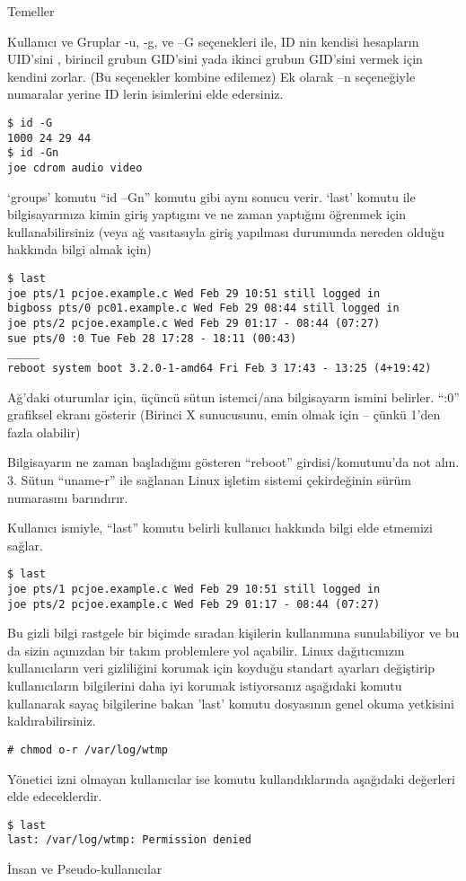 \begin{section}{Temeller}
\begin{subsection}{Kullanıcı ve Gruplar}
-u, -g, ve –G seçenekleri ile, ID nin kendisi hesapların UID’sini , birincil grubun GID’sini yada ikinci grubun GID’sini vermek için kendini zorlar. (Bu seçenekler kombine edilemez) Ek olarak –n seçeneğiyle numaralar yerine ID lerin isimlerini elde edersiniz.
\begin{verbatim}
$ id -G
1000 24 29 44
$ id -Gn
joe cdrom audio video
\end{verbatim}

‘groups’ komutu “id –Gn” komutu gibi aynı sonucu verir. ‘last’ komutu ile bilgisayarınıza kimin giriş yaptıgını ve ne zaman yaptığını öğrenmek için kullanabilirsiniz (veya ağ vasıtasıyla giriş yapılması durumunda nereden olduğu hakkında bilgi almak için)
\begin{verbatim}
$ last
joe pts/1 pcjoe.example.c Wed Feb 29 10:51 still logged in
bigboss pts/0 pc01.example.c Wed Feb 29 08:44 still logged in
joe pts/2 pcjoe.example.c Wed Feb 29 01:17 - 08:44 (07:27)
sue pts/0 :0 Tue Feb 28 17:28 - 18:11 (00:43)
_____
reboot system boot 3.2.0-1-amd64 Fri Feb 3 17:43 - 13:25 (4+19:42)
\end{verbatim}

Ağ’daki oturumlar için, üçüncü sütun istemci/ana bilgisayarın ismini belirler. “:0” grafiksel ekranı gösterir (Birinci X sunucusunu, emin olmak için – çünkü 1’den fazla olabilir)

Bilgisayarın ne zaman başladığını gösteren “reboot” girdisi/komutunu’da not alın. 3. Sütun “uname-r” ile sağlanan Linux işletim sistemi çekirdeğinin sürüm numarasını barındırır.

Kullanıcı ismiyle, “last” komutu belirli kullanıcı hakkında bilgi elde etmemizi sağlar.
\begin{verbatim}
$ last
joe pts/1 pcjoe.example.c Wed Feb 29 10:51 still logged in
joe pts/2 pcjoe.example.c Wed Feb 29 01:17 - 08:44 (07:27)
\end{verbatim}

Bu gizli bilgi rastgele bir biçimde sıradan kişilerin kullanımına sunulabiliyor ve bu da sizin açınızdan bir takım problemlere yol açabilir. Linux dağıtıcınızın kullanıcıların veri gizliliğini korumak için koyduğu standart ayarları değiştirip kullanıcıların bilgilerini daha iyi korumak istiyorsanız aşağıdaki komutu kullanarak sayaç bilgilerine bakan 'last' komutu dosyasının genel okuma yetkisini kaldırabilirsiniz.
\begin{verbatim}
# chmod o-r /var/log/wtmp
\end{verbatim}

Yönetici izni olmayan kullanıcılar ise komutu kullandıklarında aşağıdaki değerleri elde edeceklerdir.
\begin{verbatim}
$ last
last: /var/log/wtmp: Permission denied
\end{verbatim}
\end{subsection}
\begin{subsection}{İnsan ve Pseudo-kullanıcılar}


\end{subsection}
\end{section}
